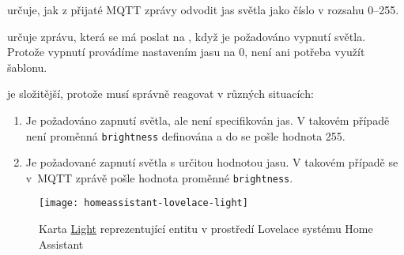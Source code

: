  určuje, jak z přijaté MQTT zprávy odvodit jas
světla jako číslo v rozsahu \numrange{0}{255}.

 určuje zprávu, která se má poslat na
, když je požadováno vypnutí světla. Protože vypnutí
provádíme nastavením jasu na \num{0}, není ani potřeba využít šablonu.

 je složitější, protože musí správně reagovat
v různých situacích:
\begin{enumerate}[nosep]
    \item Je požadováno zapnutí světla, ale není specifikován jas. V takovém
        případě není proměnná \texttt{brightness} definována a do
         se pošle hodnota \num{255}.
    \item Je požadované zapnutí světla s určitou hodnotou jasu. V takovém
        případě se v~MQTT zprávě pošle hodnota proměnné \texttt{brightness}.
\end{enumerate}

\begin{figure}[htb]
    \centering
    \texttt{[image: homeassistant-lovelace-light]}
    \caption{%
        Karta \href{https://www.home-assistant.io/lovelace/light/}{Light}
        reprezentující entitu  v prostředí
        Lovelace systému Home Assistant
    }
    \label{fig:homeassistant lovelace light}
\end{figure}




